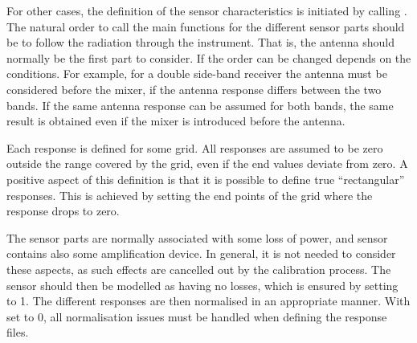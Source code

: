 For other cases, the definition of the sensor characteristics is initiated by
calling . The natural order to call the main
functions for the different sensor parts should be to follow the radiation
through the instrument. That is, the antenna should normally be the first part
to consider. If the order can be changed depends on the conditions. For
example, for a double side-band receiver the antenna must be considered before
the mixer, if the antenna response differs between the two bands. If the same
antenna response can be assumed for both bands, the same result is obtained
even if the mixer is introduced before the antenna.

Each response is defined for some grid. All responses are assumed to be zero
outside the range covered by the grid, even if the end values deviate from
zero. A positive aspect of this definition is that it is possible to define true
``rectangular'' responses. This is achieved by setting the end points of the
grid where the response drops to zero.

The sensor parts are normally associated with some loss of power, and sensor
contains also some amplification device. In general, it is not needed to
consider these aspects, as such effects are cancelled out by the calibration
process. The sensor should then be modelled as having no losses, which is
ensured by setting  to 1. The different responses are
then normalised in an appropriate manner. With  set to
0, all normalisation issues must be handled when defining the response files.




